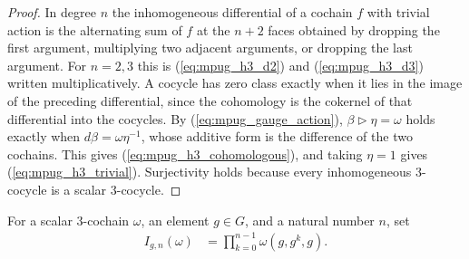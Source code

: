 \begin{proof}\leanok
    In degree $n$ the inhomogeneous differential of a cochain $f$ with
    trivial action is the alternating sum of $f$ at the $n+2$ faces
    obtained by dropping the first argument, multiplying two adjacent
    arguments, or dropping the last argument. For $n=2,3$ this is
    (\ref{eq:mpug_h3_d2}) and (\ref{eq:mpug_h3_d3}) written multiplicatively.
    A cocycle has zero class exactly when it lies in the image of the
    preceding differential, since the cohomology is the cokernel of that
    differential into the cocycles. By (\ref{eq:mpug_gauge_action}),
    $\beta\mathbin{\triangleright}\eta=\omega$ holds exactly when
    $d\beta=\omega\eta^{-1}$, whose additive form is the difference of the
    two cochains. This gives (\ref{eq:mpug_h3_cohomologous}), and taking
    $\eta=1$ gives (\ref{eq:mpug_h3_trivial}). Surjectivity holds because
    every inhomogeneous $3$-cocycle is a scalar $3$-cocycle.
\end{proof}

\begin{definition}
    \label{def:mpug_cyclic_invariant}
    \leanok
    For a scalar $3$-cochain $\omega$, an element $g\in G$, and a natural
    number $n$, set
    \begin{align}
        I_{g,n}(\omega)
         & =\prod_{k=0}^{n-1}\omega(g,g^k,g).
        \label{eq:mpug_cyclic_invariant}
    \end{align}
\end{definition}

